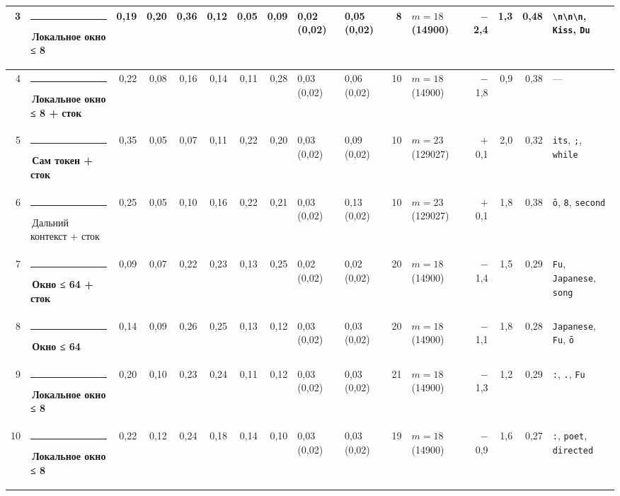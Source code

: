 \documentclass[10pt]{article}
\begin{document}
\begin{minipage}{\linewidth}
\begin{center}
{\begin{tabular}{|r|l|r|r|r|r|r|r|l|l|r|l|r|r|r|l|}
3 & \textcolor[HTML]{1BAF7A}{\rule{0.62em}{0.62em}}\,\textbf{Локальное окно ≤ 8} & 0,19 & 0,20 & 0,36 & 0,12 & 0,05 & 0,09 & 0,02 (0,02) & 0,05 (0,02) & 8 & $m{=}18$ (14900) & $-$2,4 & 1,3 & 0,48 & \texttt{\textvisiblespace{}\textbackslash{}n\textbackslash{}n\textbackslash{}n}, \texttt{\textvisiblespace{}Kiss}, \texttt{\textvisiblespace{}Du} \\ \hline
4 & \textcolor[HTML]{1BAF7A}{\rule{0.62em}{0.62em}}\,\textbf{Локальное окно ≤ 8 + сток} & 0,22 & 0,08 & 0,16 & 0,14 & 0,11 & 0,28 & 0,03 (0,02) & 0,06 (0,02) & 10 & $m{=}18$ (14900) & $-$1,8 & 0,9 & 0,38 & — \\ \hline
5 & \textcolor[HTML]{2A78D6}{\rule{0.62em}{0.62em}}\,\textbf{Сам токен + сток} & 0,35 & 0,05 & 0,07 & 0,11 & 0,22 & 0,20 & 0,03 (0,02) & 0,09 (0,02) & 10 & $m{=}23$ (129027) & $+$0,1 & 2,0 & 0,32 & \texttt{\textvisiblespace{}its}, \texttt{\textvisiblespace{};}, \texttt{\textvisiblespace{}while} \\ \hline
6 & \textcolor[HTML]{C3C2B7}{\rule{0.62em}{0.62em}}\,Дальний контекст + сток & 0,25 & 0,05 & 0,10 & 0,16 & 0,22 & 0,21 & 0,03 (0,02) & 0,13 (0,02) & 10 & $m{=}23$ (129027) & $+$0,1 & 1,8 & 0,38 & \texttt{ō}, \texttt{8}, \texttt{\textvisiblespace{}second} \\ \hline
7 & \textcolor[HTML]{EDA100}{\rule{0.62em}{0.62em}}\,\textbf{Окно ≤ 64 + сток} & 0,09 & 0,07 & 0,22 & 0,23 & 0,13 & 0,25 & 0,02 (0,02) & 0,02 (0,02) & 20 & $m{=}18$ (14900) & $-$1,4 & 1,5 & 0,29 & \texttt{\textvisiblespace{}Fu}, \texttt{\textvisiblespace{}Japanese}, \texttt{\textvisiblespace{}song} \\ \hline
8 & \textcolor[HTML]{EDA100}{\rule{0.62em}{0.62em}}\,\textbf{Окно ≤ 64} & 0,14 & 0,09 & 0,26 & 0,25 & 0,13 & 0,12 & 0,03 (0,02) & 0,03 (0,02) & 20 & $m{=}18$ (14900) & $-$1,1 & 1,8 & 0,28 & \texttt{\textvisiblespace{}Japanese}, \texttt{\textvisiblespace{}Fu}, \texttt{ō} \\ \hline
9 & \textcolor[HTML]{1BAF7A}{\rule{0.62em}{0.62em}}\,\textbf{Локальное окно ≤ 8} & 0,20 & 0,10 & 0,23 & 0,24 & 0,11 & 0,12 & 0,03 (0,02) & 0,03 (0,02) & 21 & $m{=}18$ (14900) & $-$1,3 & 1,2 & 0,29 & \texttt{\textvisiblespace{}:}, \texttt{\textvisiblespace{}.}, \texttt{\textvisiblespace{}Fu} \\ \hline
10 & \textcolor[HTML]{1BAF7A}{\rule{0.62em}{0.62em}}\,\textbf{Локальное окно ≤ 8} & 0,22 & 0,12 & 0,24 & 0,18 & 0,14 & 0,10 & 0,03 (0,02) & 0,03 (0,02) & 19 & $m{=}18$ (14900) & $-$0,9 & 1,6 & 0,27 & \texttt{\textvisiblespace{}:}, \texttt{\textvisiblespace{}poet}, \texttt{\textvisiblespace{}directed} \\ \hline

\end{tabular}}
\end{center}
\end{minipage}
\end{document}
